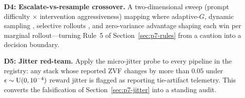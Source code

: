 \textbf{D4: Escalate-vs-resample crossover.} A two-dimensional sweep
(prompt difficulty $\times$ intervention aggressiveness) mapping where
adaptive-$G$, dynamic sampling \citep{yu2025dapo}, selective rollouts
\citep{zhang2026greso}, and zero-variance advantage shaping
\citep{le2025rlzvp} each win per marginal rollout---turning
Rule~5 of Section~\ref{sec:p7-rules} from a caution into a decision
boundary.

\textbf{D5: Jitter red-team.} Apply the micro-jitter probe to every
pipeline in the registry: any stack whose reported ZVF changes by more than
$0.05$ under $\epsilon \sim \mathrm{U}(0, 10^{-4})$ reward jitter is flagged as
reporting tie-artifact telemetry. This converts the falsification of
Section~\ref{sec:p7-jitter} into a standing audit.
